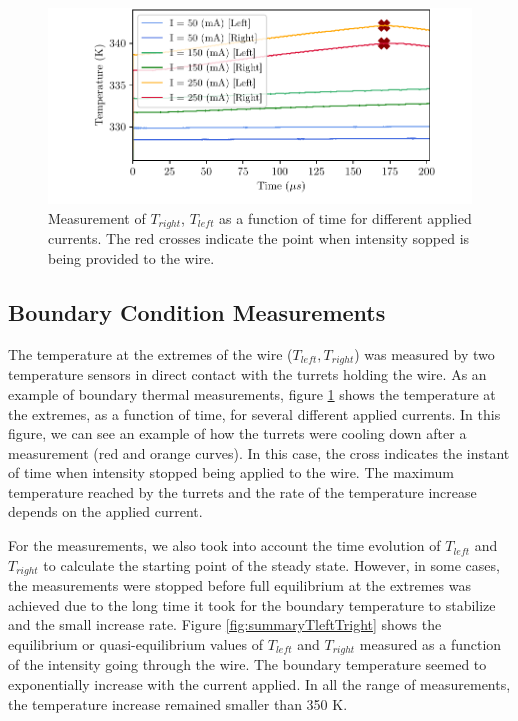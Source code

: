 \begin{figure}[h!]
    \centering
    \includegraphics[width=\columnwidth]{Figure_TrightTleft/TleftTright_time.pdf}
    \caption{Measurement of $T_{right}$, $T_{left}$ as a function of time for different applied currents. The red crosses indicate the point when intensity sopped is being provided to the wire.}
    \label{fig:ExtremeTempMeas}
\end{figure}

\subsection{Boundary Condition Measurements}
\label{sec:BoundCond}

The temperature at the extremes of the wire ($T_{left}, T_{right}$) was measured by two temperature sensors in direct contact with the turrets holding the wire. As an example of boundary thermal measurements, figure \ref{fig:ExtremeTempMeas} shows the temperature at the extremes, as a function of time, for several different applied currents. In this figure, we can see an example of how the turrets were cooling down after a measurement (red and orange curves). In this case, the cross indicates the instant of time when intensity stopped being applied to the wire. The maximum temperature reached by the turrets and the rate of the temperature increase depends on the applied current. 

For the measurements, we also took into account the time evolution of $T_{left}$ and $T_{right}$ to calculate the starting point of the steady state. However, in some cases, the measurements were stopped before full equilibrium at the extremes was achieved due to the long time it took for the boundary temperature to stabilize and the small increase rate. Figure \ref{fig:summaryTleftTright} shows the equilibrium or quasi-equilibrium values of $T_{left}$ and $T_{right}$ measured as a function of the intensity going through the wire. The boundary temperature seemed to exponentially increase with the current applied. In all the range of measurements, the temperature increase remained smaller than 350 K.

